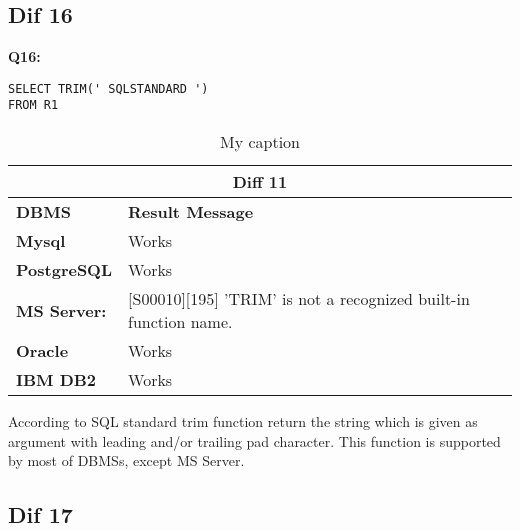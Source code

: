 \subsection{Dif 16}

\begin{mdframed}[backgroundcolor=gray!20] 
\textbf{Q16:}
\begin{lstlisting}
SELECT TRIM(' SQLSTANDARD ')
FROM R1
\end{lstlisting}
\end{mdframed} 

\begin{table}[h]
\centering
\caption{My caption}
\label{my-label}
\begin{tabular}{|p{2cm}|p{12cm}|}
\hline
\multicolumn{2}{|c|}{\textbf{Diff 11}}                                                                                                       \\ \hline
\textbf{DBMS}                              & \textbf{Result Message}                                                                         \\ \hline
{\color[HTML]{333333} \textbf{Mysql}}      & {\color[HTML]{333333} Works}                                                                    \\ \hline
{\color[HTML]{333333} \textbf{PostgreSQL}} & {\color[HTML]{333333} Works}                                                                    \\ \hline
{\color[HTML]{333333} \textbf{MS Server:}} & {\color[HTML]{333333} {[}S00010{]}{[}195{]} 'TRIM' is not a recognized built-in function name.} \\ \hline
\textbf{Oracle}                            & Works                                                                                           \\ \hline
\textbf{IBM DB2}                           & Works                                                                                           \\ \hline
\end{tabular}
\end{table}

According to SQL standard trim function return the string which is given as argument with leading and/or trailing pad character. This function is supported by most of DBMSs, except MS Server. 


\subsection{Dif 17}

